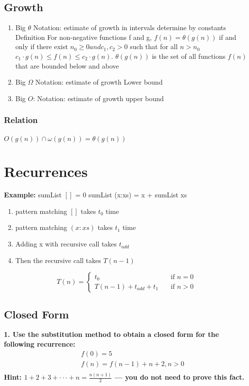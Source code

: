 \subsection{Growth}
\begin{enumerate}
\item Big $ \theta $ Notation: estimate of growth in intervals determine by constants
  Definition
  For non-negative functions f and g, $f (n) = \theta (g (n))$ if and only if there
  exist $ n_0 \geq 0 and c_1 , c_2 > 0 $ such that for all $ n > n_0 $
  $ c_1 \cdot g (n) \leq f (n) \leq c_2 \cdot g (n) $.
  $ \theta (g (n)) $ is the set of all functions $ f(n) $ that are bounded below and above
\item Big $ \Omega $ Notation: estimate of growth Lower bound
\item Big $ O $: Notation: estimate of growth upper bound
\end{enumerate}


\subsubsection{Relation}
$O(g(n)) \cap \omega (g(n)) = \theta (g(n))$



\section{Recurrences}
\noindent\textbf{Example:} \newline
sumList $[]$ = 0 \newline
sumList (x:xs) = x + sumList xs

\begin{enumerate}
\item pattern matching $[]$ takes $t_0$ time
\item pattern matching $(x:xs)$ takes $t_1$ time
\item Adding x with recursive call takes $t_{add}$
\item Then the recursive call takes $T(n-1)$
\end{enumerate}

\[ T(n) =
  \begin{cases}
    t_0                   & \quad \text{if } n = 0 \\
    T(n-1)+t_{add} +t_{1}  & \quad \text{if } n > 0 
  \end{cases}
\]

\newpage

\subsection{Closed Form}
\noindent\textbf{1. Use the substitution method to obtain a closed form for the following recurrence:}
\begin{align*}
  &\quad  f(0) = 5 \\
  &\quad  f(n) = f(n -1) + n + 2, n> 0 \\
\end{align*}
\textbf{Hint: $1 + 2 + 3 + · · · + n = \frac{n(n+1)}{2}$ — you do not need to prove this fact.}


